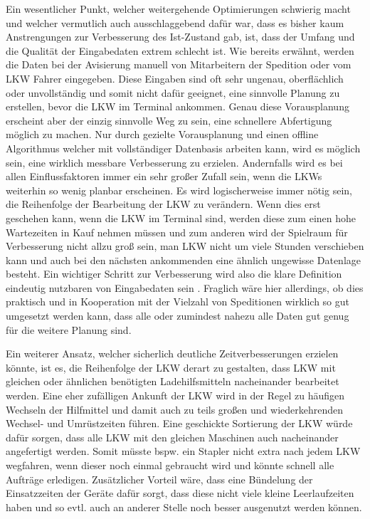 Ein wesentlicher Punkt, welcher weitergehende Optimierungen schwierig macht und welcher vermutlich auch ausschlaggebend dafür war, dass es bisher kaum Anstrengungen zur Verbesserung des Ist-Zustand gab, ist, dass der Umfang und die Qualität der Eingabedaten extrem schlecht ist. Wie bereits erwähnt, werden die Daten bei der Avisierung manuell von Mitarbeitern der Spedition oder vom LKW Fahrer eingegeben. Diese Eingaben sind oft sehr ungenau, oberflächlich oder unvollständig und somit nicht dafür geeignet, eine sinnvolle Planung zu erstellen, bevor die LKW im Terminal ankommen. Genau diese Vorausplanung erscheint aber der einzig sinnvolle Weg zu sein, eine schnellere Abfertigung möglich zu machen. Nur durch gezielte Vorausplanung und einen offline Algorithmus  welcher mit vollständiger Datenbasis arbeiten kann, wird es möglich sein, eine wirklich messbare Verbesserung zu erzielen. Andernfalls wird es bei allen Einflussfaktoren immer ein sehr großer Zufall sein, wenn die LKWs weiterhin so wenig planbar erscheinen. Es wird logischerweise immer nötig sein, die Reihenfolge der Bearbeitung der LKW zu verändern. Wenn dies erst geschehen kann, wenn die LKW im Terminal sind, werden diese zum einen hohe Wartezeiten in Kauf nehmen müssen und zum anderen wird der Spielraum für Verbesserung nicht allzu groß sein, man LKW nicht um viele Stunden verschieben kann und auch bei den nächsten ankommenden eine ähnlich ungewisse Datenlage besteht. Ein wichtiger Schritt zur Verbesserung wird also die klare Definition eindeutig nutzbaren von Eingabedaten sein . Fraglich wäre hier allerdings, ob dies praktisch und in Kooperation mit der Vielzahl von Speditionen wirklich so gut umgesetzt werden kann, dass alle oder zumindest nahezu alle Daten gut genug für die weitere Planung sind.

Ein weiterer Ansatz, welcher sicherlich deutliche Zeitverbesserungen erzielen könnte, ist es, die Reihenfolge der LKW derart zu gestalten, dass LKW mit gleichen oder ähnlichen benötigten Ladehilfsmitteln nacheinander bearbeitet werden. Eine eher zufälligen Ankunft der LKW wird in der Regel zu häufigen Wechseln der Hilfmittel und damit auch zu teils großen und wiederkehrenden Wechsel- und Umrüstzeiten führen. Eine geschickte Sortierung der LKW würde dafür sorgen, dass alle LKW mit den gleichen Maschinen auch nacheinander angefertigt werden. Somit müsste bspw. ein Stapler nicht extra nach jedem LKW wegfahren, wenn dieser noch einmal gebraucht wird und könnte schnell alle Aufträge erledigen. Zusätzlicher Vorteil wäre, dass eine Bündelung der Einsatzzeiten der Geräte dafür sorgt, dass diese nicht viele kleine Leerlaufzeiten haben und so evtl. auch an anderer Stelle noch besser ausgenutzt werden können.

